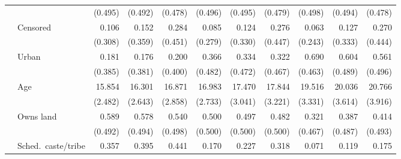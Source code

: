 \documentclass[12pt,letterpaper]{article}
\begin{document}
\begin{table}[htp]
\begin{center}
\begin{scriptsize}
\begin{threeparttable}
\begin{tabular} {@{} c l D{.}{.}{1.3} D{.}{.}{1.3} D{.}{.}{1.3} D{.}{.}{1.3} D{.}{.}{1.3} D{.}{.}{1.3} D{.}{.}{1.3} D{.}{.}{1.3} D{.}{.}{1.3} @{}}
                    &                    &     (0.495)         &     (0.492)         &     (0.478)         &     (0.496)         &     (0.495)         &     (0.479)         &     (0.498)         &     (0.494)         &     (0.478)         \\
                    &Censored            &       0.106         &       0.152         &       0.284         &       0.085         &       0.124         &       0.276         &       0.063         &       0.127         &       0.270         \\
                    &                    &     (0.308)         &     (0.359)         &     (0.451)         &     (0.279)         &     (0.330)         &     (0.447)         &     (0.243)         &     (0.333)         &     (0.444)         \\
                    &Urban               &       0.181         &       0.176         &       0.200         &       0.366         &       0.334         &       0.322         &       0.690         &       0.604         &       0.561         \\
                    &                    &     (0.385)         &     (0.381)         &     (0.400)         &     (0.482)         &     (0.472)         &     (0.467)         &     (0.463)         &     (0.489)         &     (0.496)         \\
                    &Age                 &      15.854         &      16.301         &      16.871         &      16.983         &      17.470         &      17.844         &      19.516         &      20.036         &      20.766         \\
                    &                    &     (2.482)         &     (2.643)         &     (2.858)         &     (2.733)         &     (3.041)         &     (3.221)         &     (3.331)         &     (3.614)         &     (3.916)         \\
                    &Owns land           &       0.589         &       0.578         &       0.540         &       0.500         &       0.497         &       0.482         &       0.321         &       0.387         &       0.414         \\
                    &                    &     (0.492)         &     (0.494)         &     (0.498)         &     (0.500)         &     (0.500)         &     (0.500)         &     (0.467)         &     (0.487)         &     (0.493)         \\
                    &Sched.\ caste/tribe &       0.357         &       0.395         &       0.441         &       0.170         &       0.227         &       0.318         &       0.071         &       0.119         &       0.175         \\

\end{tabular}
\end{threeparttable}
\end{scriptsize}
\end{center}
\end{table}
\end{document}
